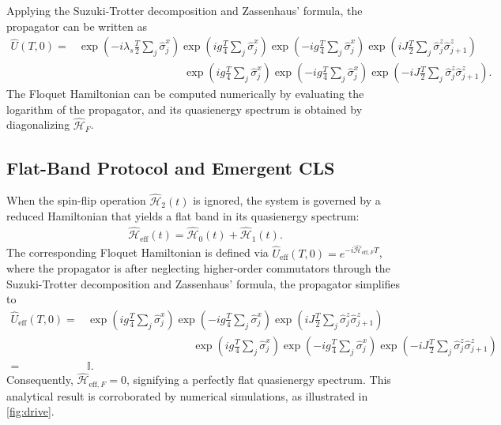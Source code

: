 \documentclass[a4paper, 10pt]{article}
\begin{document}
Applying the Suzuki-Trotter decomposition and Zassenhaus’ formula, the propagator can be written as
\begin{align}
    \hat{U}(T,0) =& \exp\left(-i \lambda_s \frac{T}{2} \sum_{j}\hat{\sigma}_j^x\right)
    \exp\left(i g \frac{T}{4} \sum_{j}\hat{\sigma}_j^x\right)
    \exp\left(-i g \frac{T}{4} \sum_{j}\hat{\sigma}_j^x\right)\exp\left(i J \frac{T}{2} \sum_{j} \hat{\sigma}_j^z \hat{\sigma}_{j+1}^z\right)\nonumber\\
    &\hspace{4cm}\exp\left(i g \frac{T}{4} \sum_{j}\hat{\sigma}_j^x\right)\exp\left(-i g \frac{T}{4} \sum_{j}\hat{\sigma}_j^x\right)\exp\left(-i J \frac{T}{2} \sum_{j} \hat{\sigma}_j^z \hat{\sigma}_{j+1}^z\right).
\end{align}
The Floquet Hamiltonian can be computed numerically by evaluating the logarithm of the propagator, and its quasienergy spectrum is obtained by diagonalizing $\hat{\mathcal{H}}_F$.

\subsection{Flat-Band Protocol and Emergent CLS}
When the spin-flip operation $\hat{\mathcal{H}}_2(t)$ is ignored, the system is governed by a reduced Hamiltonian that yields a flat band in its quasienergy spectrum:
\begin{align}
    \hat{\mathcal{H}}_{\text{eff}}(t) = \hat{\mathcal{H}}_0(t) + \hat{\mathcal{H}}_1(t).
\end{align}
The corresponding Floquet Hamiltonian is defined via $\hat{U}_{\text{eff}}(T,0) = e^{-i \hat{\mathcal{H}}_{\text{eff},F} T}$, where the propagator is after neglecting higher-order commutators through the Suzuki-Trotter decomposition and Zassenhaus’ formula, the propagator simplifies to
\begin{align}
    \hat{U}_{\text{eff}}(T,0) =& 
        \exp\left(i g \frac{T}{4} \sum_{j}\hat{\sigma}_j^x\right)
        \exp\left(-i g \frac{T}{4} \sum_{j}\hat{\sigma}_j^x\right)\exp\left(i J \frac{T}{2} \sum_{j} \hat{\sigma}_j^z \hat{\sigma}_{j+1}^z\right)\nonumber\\
        &\hspace{4cm}\exp\left(i g \frac{T}{4} \sum_{j}\hat{\sigma}_j^x\right)\exp\left(-i g \frac{T}{4} \sum_{j}\hat{\sigma}_j^x\right)\exp\left(-i J \frac{T}{2} \sum_{j} \hat{\sigma}_j^z \hat{\sigma}_{j+1}^z\right)\nonumber\\
        =& \mathbb{I}.
\end{align}
Consequently, $\hat{\mathcal{H}}_{\text{eff},F} = 0$, signifying a perfectly flat quasienergy spectrum. This analytical result is corroborated by numerical simulations, as illustrated in \cref{fig:drive}.
\end{document}
